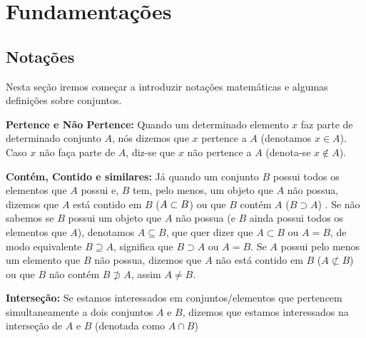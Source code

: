 \section{Fundamentações}
    \subsection{Notações}
    Nesta seção iremos começar a introduzir notações matemáticas e algumas definições sobre conjuntos.
    
    \textbf{Pertence e Não Pertence:} Quando um determinado elemento $x$ faz parte de determinado conjunto $A$, nós dizemos que $x$ pertence a $A$ (denotamos $x \in A$). Caso $x$ não faça parte de $A$, diz-se que $x$ não pertence a $A$ (denota-se  $x \notin A$).
    
    \textbf{Contém, Contido e similares:} Já quando um conjunto $B$ possui todos os elementos que $A$ possui e, $B$ tem, pelo menos, um objeto que $A$ não possua, dizemos que $A$ está contido em $B$ ($\space A \subset B$) ou que $B$ contém $A$ ($B \supset A$)%
    . Se não sabemos se $B$ possui um objeto que $A$ não possua (e $B$ ainda possui todos os elementos que $A$), denotamos $A \subseteq B$, que quer dizer que $A \subset B$ ou $A=B$, de modo equivalente $B \supseteq A$, significa que $B \supset A$ ou $A=B$. Se $A$ possui pelo menos um elemento que $B$ não possua, dizemos que $A$ não está contido em $B$ ($A \not\subset B$) ou que $B$ não contém $B\not\supset A$, assim $A \neq B$. 
    

    \textbf{Interseção:} Se estamos interessados em conjuntos/elementos que pertencem simultaneamente a dois conjuntos $A$ e $B$, dizemos que estamos interessados na interseção de $A$ e $B$ (denotada como $A \cap B$)%
    
    
